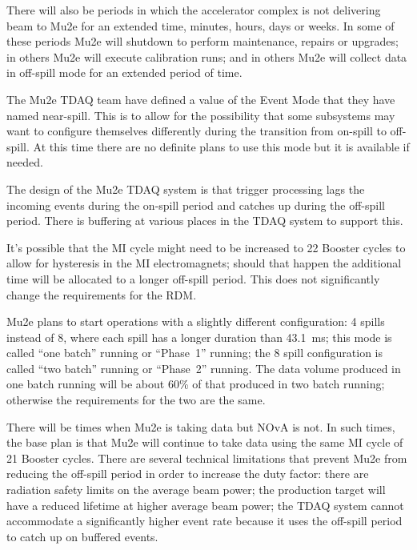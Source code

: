 There will also be periods in which the accelerator complex is not delivering
beam to Mu2e for an extended time, minutes, hours, days or weeks.
In some of these periods Mu2e will shutdown to perform maintenance, repairs or upgrades;
in others Mu2e will execute calibration runs;
and in others Mu2e will collect data in off-spill mode for an extended period of time.


The Mu2e TDAQ team have defined a value of the Event Mode that they have named near-spill.
This is to allow for the possibility that some subsystems may want to
configure themselves differently during the transition from on-spill to off-spill.
At this time there are no definite plans to use this mode but it is available if needed.

The design of the Mu2e TDAQ system is that trigger processing lags the incoming events
during the on-spill period and catches up during the off-spill period.  There is
buffering at various places in the TDAQ system to support this.

It's possible that the MI cycle might need to be increased to 22 Booster cycles to
allow for hysteresis in the MI electromagnets;
should that happen the additional time will be allocated to a longer off-spill period.
This does not significantly change the requirements for the RDM.

Mu2e plans to start operations with a slightly different configuration:
4 spills instead of 8, where each spill has a longer duration than 43.1~ms;
this mode is called ``one batch'' running or ``Phase~1'' running;
the 8 spill configuration is called ``two batch'' running or ``Phase~2'' running.
The data volume produced in one batch running will be about 60\% of that produced
in two batch running; otherwise the requirements for the two are the same.

There will be times when Mu2e is taking data but NOvA is not.
In such times, the base plan is that Mu2e will continue to take data using the same MI cycle of 21 Booster cycles.
There are several technical limitations that prevent Mu2e from reducing the off-spill period
in order to increase the duty factor:
there are radiation safety limits on the average beam power;
the production target will have a reduced lifetime at higher average beam power;
the TDAQ system cannot accommodate a significantly higher event rate because it
uses the off-spill period to catch up on buffered events.


